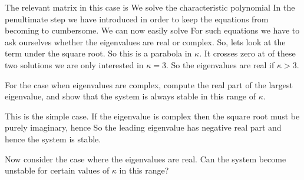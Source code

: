 \solution
The relevant matrix in this case is 
We solve the characteristic polynomial
In the penultimate step we have introduced
in order to keep the equations from becoming to cumbersome. We can now easily solve 
For such equations we have to ask ourselves whether the eigenvalues are real or complex. So, lets look at the term under the square root. 
So this is a parabola in $\kappa$. It crosses zero at 
of these two solutions we are only interested in $\kappa=3$. So the eigenvalues are real if $\kappa>3$.

\subquestion
For the case when eigenvalues are complex, compute the real part of the largest eigenvalue, and show that the system is always stable in this range of $\kappa$.

\solution
This is the simple case. If the eigenvalue
is complex then the square root must be purely imaginary, hence
So the leading eigenvalue has negative real part and hence the system is stable.

\subquestion
Now consider the case where the eigenvalues are real. Can the system become unstable for certain values of $\kappa$ in this range?

